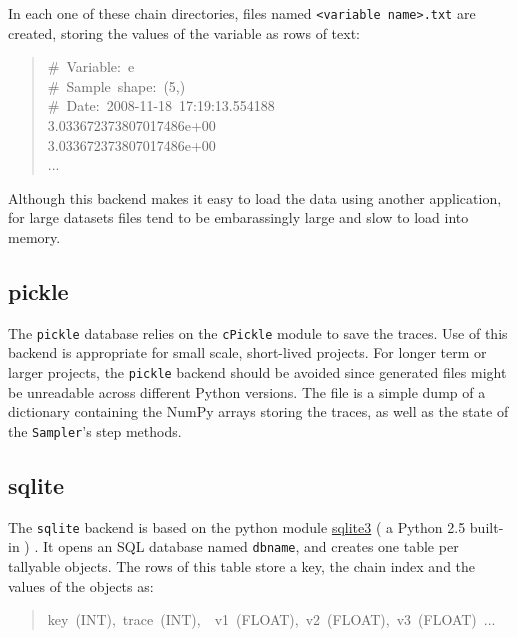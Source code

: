 In each one of these chain directories, files named \texttt{<variable name>.txt}
are created, storing the values of the variable as rows of text:
\begin{quote}{\ttfamily \raggedright \noindent
{\#}~Variable:~e~\\
{\#}~Sample~shape:~(5,)~\\
{\#}~Date:~2008-11-18~17:19:13.554188~\\
3.033672373807017486e+00~\\
3.033672373807017486e+00~\\
...
}\end{quote}

Although this backend makes it easy to load the data using another application,
for large datasets files tend to be embarassingly large and slow to load
into memory.



\hypertarget{pickle}{}
\subsection*{pickle}
\label{pickle}

The \texttt{pickle} database relies on the \texttt{cPickle} module to save the
traces. Use of this backend is appropriate for small scale,
short-lived projects. For longer term or larger projects, the \texttt{pickle}
backend should be avoided since generated files might be unreadable
across different Python versions. The  file is a simple dump of a
dictionary containing the NumPy arrays storing the traces, as well as
the state of the \texttt{Sampler}'s step methods.



\hypertarget{sqlite}{}
\subsection*{sqlite}
\label{sqlite}

The \texttt{sqlite} backend is based on the python module \href{http://www.sqlite.org}{sqlite3} (
a Python 2.5 built-in ) . It opens an SQL database named \texttt{dbname},
and creates one table per tallyable objects. The rows of this table
store a key, the chain index and the values of the objects as:
\begin{quote}{\ttfamily \raggedright \noindent
key~(INT),~trace~(INT),~~v1~(FLOAT),~v2~(FLOAT),~v3~(FLOAT)~...
}\end{quote}

